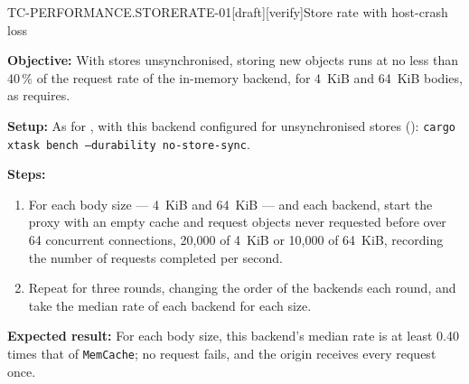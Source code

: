 \begin{requirement}{TC-PERFORMANCE.STORERATE-01}[draft][verify]{Store rate with host-crash loss}


  \textbf{Objective:} With stores unsynchronised, storing new objects runs at
  no less than 40\,\% of the request rate of the in-memory backend, for 4~KiB
  and 64~KiB bodies, as  requires.

  \textbf{Setup:} As for , with this backend
  configured for unsynchronised stores ():
  \texttt{cargo xtask bench --durability no-store-sync}.

  \textbf{Steps:}
  \begin{enumerate}
    \item For each body size --- 4~KiB and 64~KiB --- and each backend, start
      the proxy with an empty cache and request objects never requested
      before over 64 concurrent connections, 20{,}000 of 4~KiB or 10{,}000 of
      64~KiB, recording the number of requests completed per second.
    \item Repeat for three rounds, changing the order of the backends each
      round, and take the median rate of each backend for each size.
  \end{enumerate}

  \textbf{Expected result:} For each body size, this backend's median rate is
  at least 0.40 times that of \texttt{MemCache}; no request fails, and the
  origin receives every request once.



\end{requirement}

